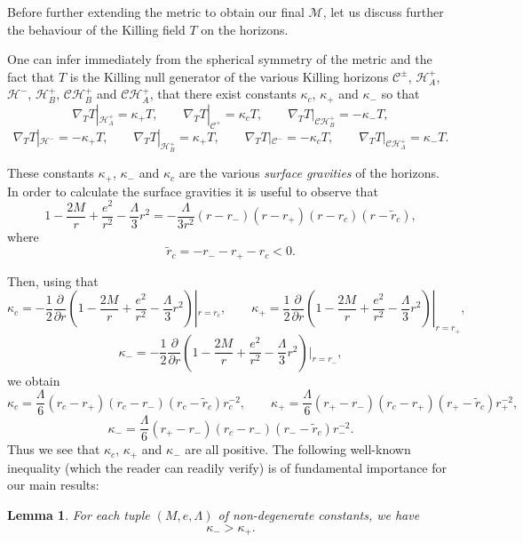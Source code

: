 \documentclass[A4,10pt]{article}
\newtheorem{lemma}{Lemma}[subsection]
\begin{document}
Before further extending the metric to obtain our final $\mathcal{M}$, 
let us discuss further the behaviour of the Killing field $T$ on the horizons.

One can infer immediately from the spherical symmetry
of the metric and the fact that 
$T$ is the Killing null generator of the various Killing horizons $\mathcal{C}^{\pm}$, $\mathcal{H}^+_A$, $\mathcal{H}^-$, $\mathcal{H}^+_B$, $\mathcal{CH}^+_B$ and $\mathcal{CH}^+_A$,
that there exist constants $\kappa_c$, $\kappa_+$ and $\kappa_-$ so that 
\[\nabla_TT|_{\mathcal{H}^+_A} = \kappa_+T,\qquad \nabla_TT|_{\mathcal{C}^+} = \kappa_cT,\qquad \nabla_TT|_{\mathcal{CH}^+_B} = -\kappa_-T,\]
\[\nabla_TT|_{\mathcal{H}^-} = -\kappa_+T,\qquad \nabla_TT|_{\mathcal{H}^+_B} = \kappa_+T,\qquad \nabla_TT|_{\mathcal{C}^-} = -\kappa_cT,\qquad \nabla_TT|_{\mathcal{CH}^+_A} = \kappa_-T.\]

These constants $\kappa_+$, $\kappa_-$ and $\kappa_c$ are the various \emph{surface gravities} of the horizons. In order to calculate the surface gravities it is useful to observe that
\[1 - \frac{2M}{r} + \frac{e^2}{r^2} - \frac{\Lambda}{3}r^2 = -\frac{\Lambda}{3r^2}(r-r_-)(r-r_+)(r-r_c)(r-\tilde{r}_c),\]
where
\[\tilde{r}_c = - r_- - r_+-r_c < 0.\]

Then, using that
\[\kappa_c = -\frac{1}{2}\frac{\partial}{\partial r}\left(1-\frac{2M}{r} + \frac{e^2}{r^2} - \frac{\Lambda}{3}r^2\right)|_{r=r_c},\qquad \kappa_+ = \frac{1}{2}\frac{\partial}{\partial r}\left(1-\frac{2M}{r} + \frac{e^2}{r^2} - \frac{\Lambda}{3}r^2\right)|_{r=r_+},\]
\[\kappa_- = -\frac{1}{2}\frac{\partial}{\partial r}\left(1-\frac{2M}{r} + \frac{e^2}{r^2} - \frac{\Lambda}{3}r^2\right)|_{r=r_-},\]
we obtain
\[\kappa_c = \frac{\Lambda}{6}(r_c-r_+)(r_c-r_-)(r_c-\tilde r_c)r_c^{-2},\qquad \kappa_+ = \frac{\Lambda}{6}(r_+-r_-)(r_c-r_+)(r_+-\tilde r_c)r_+^{-2},\]
\[\kappa_- = \frac{\Lambda}{6}(r_+ -r_-)(r_c-r_-)(r_--\tilde r_c)r_-^{-2}.\]
Thus we see that $\kappa_c$, $\kappa_+$ and $\kappa_-$ are all positive. The following
well-known inequality (which the reader can readily verify) is of fundamental importance for our main results:
\begin{lemma}\label{fundsurfgrav} For each tuple $\left(M,e,\Lambda\right)$ of non-degenerate constants, we have 
\begin{equation*}
\kappa_- > \kappa_+.
\end{equation*}
\end{lemma}
\end{document}
